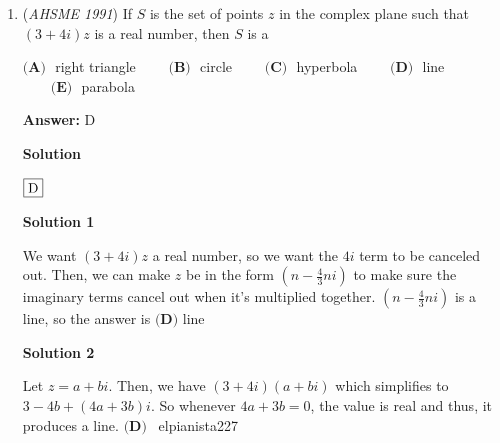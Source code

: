 \begin{enumerate}
 (a) It is a palindrome
(b) It factors as a product of a 2-digit prime palindrome and a 3-digit prime palindrome. 


 How many years in the millenium between 1000 and 2000 have properties (a) and (b)?


 $\textbf{(A) } 1\qquad \textbf{(B) } 2\qquad \textbf{(C) } 3\qquad \textbf{(D) } 4\qquad \textbf{(E) } 5$

 \textbf{Answer: }D



\textbf{Solution}

Solution by e\_power\_pi\_times\_i

 Notice that all four-digit palindromes are divisible by $11$, so that is our two-digit prime. Because the other factor is a three-digit number, we are looking at palindromes between $1100$ and $2000$, which also means that the last digit of the three-digit number is $1$. Checking through the three-digit numbers $101, 111, 121,\dots, 181$, we find out that there are $\boxed{\textbf{(D) } 4}$ three-digit prime numbers, which when multiplied by $11$, result in palindromes.

 


	\item (\textit{AHSME 1991}) If $S$ is the set of points $z$ in the complex plane such that $(3+4i)z$ is a real number, then $S$ is a 


 $\textbf{(A) }$ right triangle $\qquad \textbf{(B) }$ circle $\qquad \textbf{(C) }$ hyperbola $\qquad \textbf{(D) }$ line $\qquad \textbf{(E) }$ parabola


 
 \textbf{Answer: }D



\textbf{Solution}

$\fbox{D}$




\textbf{Solution 1}

We want $(3+4i)z$ a real number, so we want the $4i$ term to be canceled out. Then, we can make $z$ be in the form $(n-\frac{4}{3}ni)$ to make sure the imaginary terms cancel out when it's multiplied together. $(n-\frac{4}{3}ni)$ is a line, so the answer is $\textbf{(D) } \text{line}$




\textbf{Solution 2}

Let $z = a + bi$. Then, we have $(3 + 4i)(a + bi)$ which simplifies to $3 - 4b + (4a + 3b)i$. So whenever $4a + 3b = 0$, the value is real and thus, it produces a line. $\textbf{(D) }$~elpianista227


\end{enumerate}
